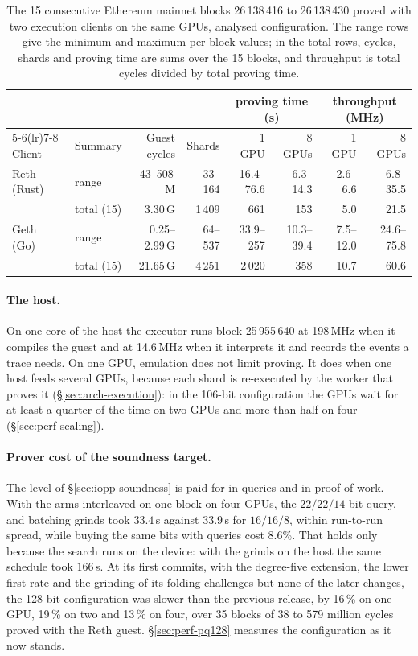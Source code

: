 \begin{table}[t]
\centering
\caption{The 15 consecutive Ethereum mainnet blocks 26\,138\,416 to 26\,138\,430 proved with two execution clients on the same GPUs, analysed configuration. The range rows give the minimum and maximum per-block values; in the total rows, cycles, shards and proving time are sums over the 15 blocks, and throughput is total cycles divided by total proving time.}
\label{tab:clients}
\small
\begin{tabular}{@{}llrrrrrr@{}}
\toprule
 & & & & \multicolumn{2}{c}{proving time (s)} & \multicolumn{2}{c}{throughput (MHz)} \\
\cmidrule(lr){5-6}\cmidrule(lr){7-8}
Client & Summary & Guest cycles & Shards & 1 GPU & 8 GPUs & 1 GPU & 8 GPUs \\
\midrule
Reth (Rust) & range & 43--508\,M & 33--164 & 16.4--76.6 & 6.3--14.3 & 2.6--6.6 & 6.8--35.5 \\
 & total (15) & 3.30\,G & 1\,409 & 661 & 153 & 5.0 & 21.5 \\
\midrule
Geth (Go) & range & 0.25--2.99\,G & 64--537 & 33.9--257 & 10.3--39.4 & 7.5--12.0 & 24.6--75.8 \\
 & total (15) & 21.65\,G & 4\,251 & 2\,020 & 358 & 10.7 & 60.6 \\
\bottomrule
\end{tabular}
\end{table}

\paragraph{The host.}\label{sec:perf-emu}\label{sec:perf-host} On one core of the host the executor runs block 25\,955\,640 at 198\,MHz when it compiles the guest and at 14.6\,MHz when it interprets it and records the events a trace needs. On one GPU, emulation does not limit proving. It does when one host feeds several GPUs, because each shard is re-executed by the worker that proves it (\S\ref{sec:arch-execution}): in the 106-bit configuration the GPUs wait for at least a quarter of the time on two GPUs and more than half on four (\S\ref{sec:perf-scaling}).

\paragraph{Prover cost of the soundness target.}\label{sec:perf-grind} The level of \S\ref{sec:iopp-soundness} is paid for in queries and in proof-of-work. With the arms interleaved on one block on four GPUs, the $22/22/14$-bit query, \LogUp{} and batching grinds took $33.4$\,s against $33.9$\,s for $16/16/8$, within run-to-run spread, while buying the same bits with queries cost $8.6$\%. That holds only because the search runs on the device: with the grinds on the host the same schedule took $166$\,s. At its first commits, with the degree-five extension, the lower first rate and the grinding of its folding challenges but none of the later changes, the 128-bit configuration was slower than the previous release, by 16\,\% on one GPU, 19\,\% on two and 13\,\% on four, over 35 blocks of 38 to 579 million cycles proved with the Reth guest. \S\ref{sec:perf-pq128} measures the configuration as it now stands.

